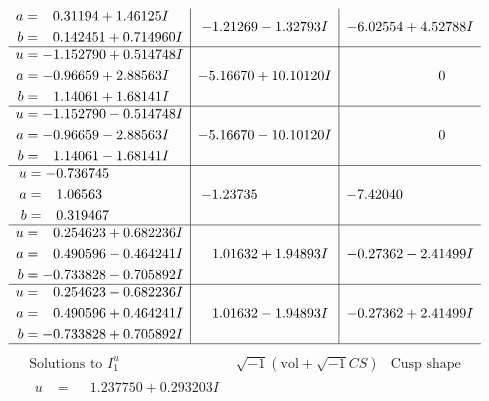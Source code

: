 \documentclass[1p]{elsarticle_modified}
\theoremstyle{definition}
\newcommand{\I}{\sqrt{-1}}
\begin{document}
$$\begin{array}{c|c|c}
\begin{aligned}
a &= \phantom{-}0.31194 + 1.46125 I \\
b &= \phantom{-}0.142451 + 0.714960 I\end{aligned}
 & -1.21269 - 1.32793 I & -6.02554 + 4.52788 I \\ \hline\begin{aligned}
u &= -1.152790 + 0.514748 I \\
a &= -0.96659 + 2.88563 I \\
b &= \phantom{-}1.14061 + 1.68141 I\end{aligned}
 & -5.16670 + 10.10120 I & \phantom{-0.000000 } 0 \\ \hline\begin{aligned}
u &= -1.152790 - 0.514748 I \\
a &= -0.96659 - 2.88563 I \\
b &= \phantom{-}1.14061 - 1.68141 I\end{aligned}
 & -5.16670 - 10.10120 I & \phantom{-0.000000 } 0 \\ \hline\begin{aligned}
u &= -0.736745\phantom{ +0.000000I} \\
a &= \phantom{-}1.06563\phantom{ +0.000000I} \\
b &= \phantom{-}0.319467\phantom{ +0.000000I}\end{aligned}
 & -1.23735\phantom{ +0.000000I} & -7.42040\phantom{ +0.000000I} \\ \hline\begin{aligned}
u &= \phantom{-}0.254623 + 0.682236 I \\
a &= \phantom{-}0.490596 - 0.464241 I \\
b &= -0.733828 - 0.705892 I\end{aligned}
 & \phantom{-}1.01632 + 1.94893 I & -0.27362 - 2.41499 I \\ \hline\begin{aligned}
u &= \phantom{-}0.254623 - 0.682236 I \\
a &= \phantom{-}0.490596 + 0.464241 I \\
b &= -0.733828 + 0.705892 I\end{aligned}
 & \phantom{-}1.01632 - 1.94893 I & -0.27362 + 2.41499 I\\
 \hline 
 \end{array}$$\newpage$$\begin{array}{c|c|c}  
\text{Solutions to }I^u_{1}& \I (\text{vol} + \sqrt{-1}CS) & \text{Cusp shape}\\
 \hline 
\begin{aligned}
u &= \phantom{-}1.237750 + 0.293203 I \\

\end{aligned}
\end{array}$$
\end{document}
